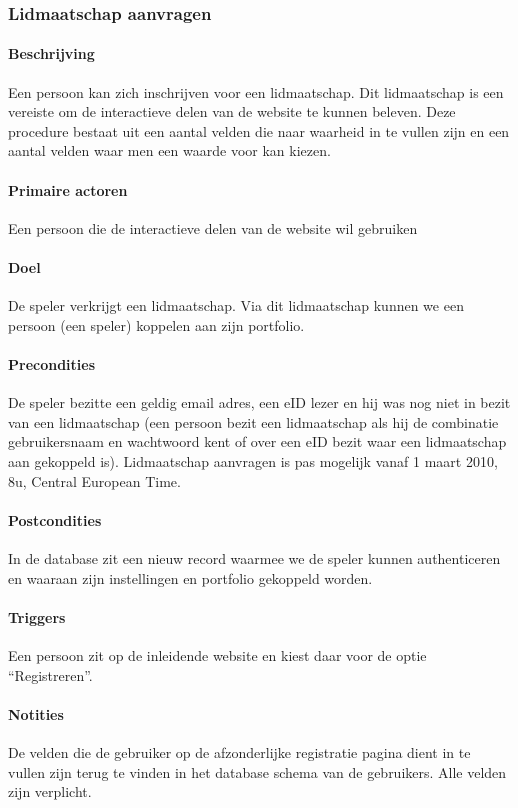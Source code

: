 \subsubsection{Lidmaatschap aanvragen}
\begin{compact}
\paragraph{Beschrijving}Een persoon kan zich inschrijven voor een lidmaatschap. Dit lidmaatschap is een vereiste om de interactieve delen van de website te kunnen beleven. Deze procedure bestaat uit een aantal velden die naar waarheid in te vullen zijn en een aantal velden waar men een waarde voor kan kiezen.
\paragraph{Primaire actoren}Een persoon die de interactieve delen van de website wil gebruiken
\paragraph{Doel}De speler verkrijgt een lidmaatschap. Via dit lidmaatschap kunnen we een persoon (een speler) koppelen aan zijn portfolio.
\paragraph{Precondities}De speler bezitte een geldig email adres, een eID lezer en hij was nog niet in bezit van een lidmaatschap (een persoon bezit een lidmaatschap als hij de combinatie gebruikersnaam en wachtwoord kent of over een eID bezit waar een lidmaatschap aan gekoppeld is). \small{Lidmaatschap aanvragen is pas mogelijk vanaf 1 maart 2010, 8u, Central European Time.}
\paragraph{Postcondities}In de database zit een nieuw record waarmee we de speler kunnen authenticeren en waaraan zijn instellingen en portfolio gekoppeld worden.
\paragraph{Triggers}Een persoon zit op de inleidende website en kiest daar voor de optie ``Registreren''.
\paragraph{Notities}De velden die de gebruiker op de afzonderlijke registratie pagina dient in te vullen zijn terug te vinden in het database schema van de gebruikers. Alle velden zijn verplicht.

\end{compact}
